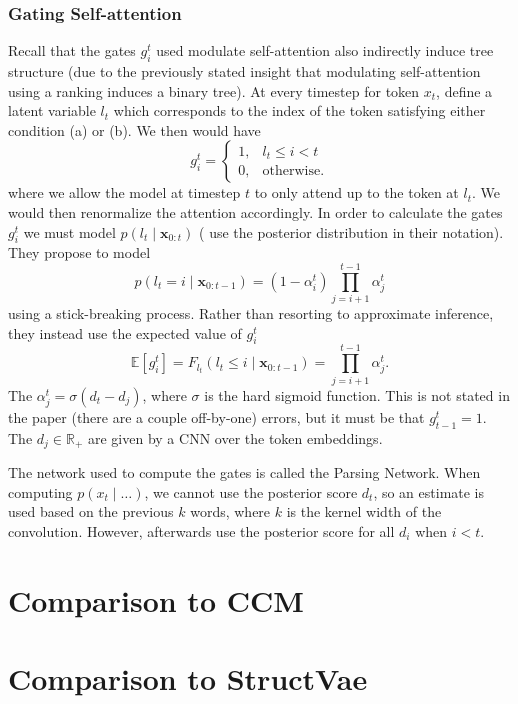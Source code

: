 \documentclass{article}
\newcommand\E[1]{\mathbb{E}\left[#1\right]}
\newcommand{\bx}{\mathbf{x}}
\newcommand{\R}{\mathbb{R}}
\begin{document}
\subsubsection{Gating Self-attention}
\label{subsec:gates}
Recall that the gates $g_i^t$ used modulate self-attention also indirectly induce tree structure
(due to the previously stated insight that modulating self-attention
using a ranking induces a binary tree).
At every timestep for token $x_t$,
\citet{shen2018prpn} define a latent variable $l_t$ which corresponds to the index of the 
token satisfying either condition (a) or (b).
We then would have $$g_i^t = \left\{\begin{array}{lr}
1, & l_t \le i < t\\
0, & \textrm{otherwise.}
\end{array}\right.$$
where we allow the model at timestep $t$ to only attend up to the token at $l_t$.
We would then renormalize the attention accordingly.
In order to calculate the gates $g_i^t$ we must model $p(l_t\mid\bx_{0:t})$ 
(\citet{shen2018prpn} use the posterior distribution in their notation).
They propose to model 
$$p(l_t=i\mid\bx_{0:t-1})=(1-\alpha_i^t)\prod_{j=i+1}^{t-1}\alpha_j^t$$
using a stick-breaking process.
Rather than resorting to approximate inference, they instead use the expected value of $g_i^t$
$$\E{g_i^t} = F_{l_t}(l_t \le i\mid\bx_{0:t-1}) = \prod_{j=i+1}^{t-1}\alpha_j^t.$$
The $\alpha_j^t = \sigma(d_t - d_j)$, where $\sigma$ is the hard sigmoid function.
This is not stated in the paper (there are a couple off-by-one) errors,
but it must be that $g_{t-1}^t = 1$.
The $d_j\in\R_+$ are given by a CNN over the token embeddings.

The network used to compute the gates is called the Parsing Network.
When computing $p(x_t\mid\ldots)$, we cannot use the posterior score $d_t$,
so an estimate is used based on the previous $k$ words, where $k$ is the 
kernel width of the convolution.
However, afterwards \citet{shen2018prpn} use the posterior score for all $d_i$ when $i < t$.

\section{Comparison to CCM \citep{klein-2002-ccm}}
\citep{klein-2002-ccm2}
\citep{golland-2012-ccm,huang-2012-ccm}
\section{Comparison to StructVae \citep{yin18structvae}}
\end{document}
